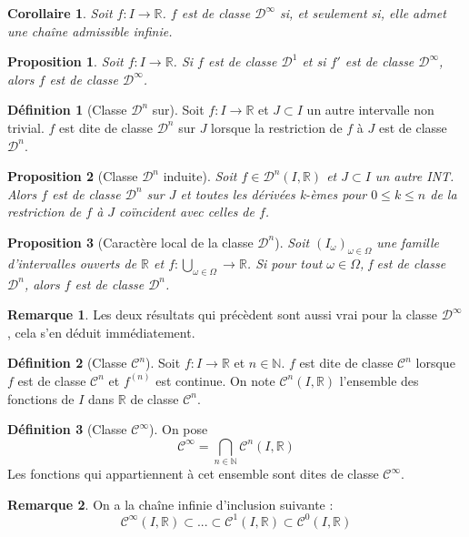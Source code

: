 \documentclass[french]{book}
\newcommand{\N}{\mathbb{N}}
\newcommand{\R}{\mathbb{R}}
\theoremstyle{plain}
\newtheorem{prop}{Proposition}[chapter]
\newtheorem{cor}{Corollaire}[chapter]
\theoremstyle{definition}
\newtheorem{dfn}{Définition}[chapter]
\newtheorem{rmq}{Remarque}[chapter]
\theoremstyle{remark}
\begin{document}
\begin{cor}
	Soit $f:I\rightarrow\R$. $f$ est de classe $\mathcal{D}^\infty$ si, et seulement si, elle admet une chaîne admissible infinie.
\end{cor}
\begin{prop}
	Soit $f:I\rightarrow\R$. Si $f$ est de classe $\mathcal{D}^1$ et si $f'$ est de classe $\mathcal{D}^\infty$, alors $f$ est de classe $\mathcal{D}^\infty$.
\end{prop}
\begin{dfn}[Classe $\mathcal{D}^n$ sur]
	Soit $f:I\rightarrow\R$ et $J\subset I$ un autre intervalle non trivial. $f$ est dite de classe $\mathcal{D}^n$ sur $J$ lorsque la restriction de $f$ à $J$ est de classe $\mathcal{D}^n$.
\end{dfn}
\begin{prop}[Classe $\mathcal{D}^n$ induite]
	Soit $f\in\mathcal{D}^n(I,\R)$ et $J\subset I$ un autre INT. Alors $f$ est de classe $\mathcal{D}^n$ sur $J$ et toutes les dérivées k-èmes pour $0 \leqslant k \leqslant n$ de la restriction de $f$ à $J$ coïncident avec celles de $f$. 
\end{prop}
\begin{prop}[Caractère local de la classe $\mathcal{D}^n$]
	Soit $(I_\omega)_{\omega\in\Omega}$ une famille d'intervalles ouverts de $\R$ et $\displaystyle f:\bigcup_{\omega\in\Omega} \rightarrow \R$. Si pour tout $\omega\in\Omega$, f est de classe $\mathcal{D}^n$, alors $f$ est de classe $\mathcal{D}^n$.
\end{prop}
\begin{rmq} Les deux résultats qui précèdent sont aussi vrai pour la classe $\mathcal{D}^\infty$, cela s'en déduit immédiatement. \end{rmq}
\begin{dfn}[Classe $\mathcal{C}^n$]
	Soit $f:I\rightarrow\R$ et $n\in\N$. $f$ est dite de classe $\mathcal{C}^n$ lorsque $f$ est de classe $\mathcal{C}^n$ et $f^{(n)}$ est continue. On note $\mathcal{C}^n(I,\R)$ l'ensemble des fonctions de $I$ dans $\R$ de classe $\mathcal{C}^n$.
\end{dfn}
\begin{dfn}[Classe $\mathcal{C}^\infty$]
	On pose $$\mathcal{C}^\infty=\bigcap_{n\in\N}\mathcal{C}^n(I,\R)$$Les fonctions qui appartiennent à cet ensemble sont dites de classe $\mathcal{C}^\infty$.
\end{dfn}
\begin{rmq} On a la chaîne infinie d'inclusion suivante : $$\mathcal{C}^\infty(I, \R) \subset ... \subset \mathcal{C}^1(I,\R) \subset \mathcal{C}^0(I,\R)$$ \end{rmq}
\end{document}
